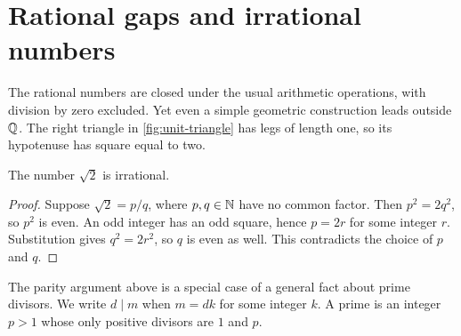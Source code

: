 \section{Rational gaps and irrational numbers}
\label{sec:analysis-i:rational-gaps}

 The rational numbers
are closed under the usual arithmetic operations, with division by zero
excluded. Yet even a simple geometric construction leads outside $\mathbb{Q}$.
The right triangle in \autoref{fig:unit-triangle} has legs of length one,
so its hypotenuse has square equal to two.
\begin{marginfigure}
  \centering
  
  \caption[A unit right triangle.]{A unit right triangle produces the length $\sqrt{2}$.}
  \label{fig:unit-triangle}
\end{marginfigure}

\begin{proposition}
  The number $\sqrt{2}$ is irrational.
\end{proposition}
\begin{proof}
  Suppose $\sqrt{2}=p/q$, where $p,q\in\mathbb{N}$ have no common factor.
  Then $p^2=2q^2$, so $p^2$ is even. An odd integer has an odd square,
  hence $p=2r$ for some integer $r$. Substitution gives $q^2=2r^2$,
  so $q$ is even as well. This contradicts the choice of $p$ and $q$.
\end{proof}

The parity argument above is a special case of a general fact about
prime divisors. We write $d\mid m$ when $m=dk$ for some integer $k$.
A prime is an integer $p>1$ whose only positive divisors are $1$ and $p$.

